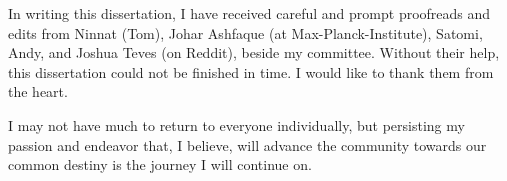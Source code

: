 \begin{acknowledgments}
In writing this dissertation, I have received careful and prompt proofreads and edits from Ninnat (Tom), Johar Ashfaque (at Max-Planck-Institute), Satomi, Andy, and Joshua Teves (on Reddit), beside my committee.
Without their help, this dissertation could not be finished in time. I would like to thank them from the heart.

I may not have much to return to everyone individually, but persisting my passion and endeavor that, I believe, will advance the community towards our common destiny is the journey I will continue on.
\end{acknowledgments} 